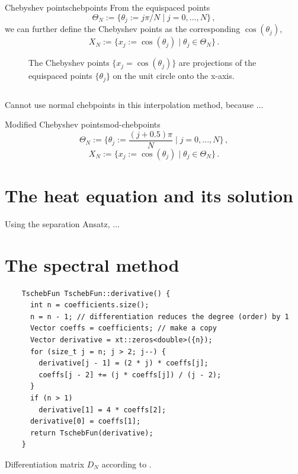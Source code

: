 \documentclass[12pt, a4paper]{article}
\begin{document}
  \begin{definition}{Chebyshev points}{chebpoints}
    From the equispaced points
    $$\Theta_N := \{\theta_j := j\pi/N \;|\; j = 0, ..., N\} \,,$$
    we can further define the Chebyshev points as the corresponding $\cos(\theta_j)$,
    $$X_N := \{x_j := \cos(\theta_j) \;|\; \theta_j \in \Theta_N\} \,.$$
  \end{definition}

  \begin{figure}[H]
    \centering
    \caption{The Chebyshev points $\{x_j = \cos(\theta_j)\}$ are projections of the equispaced points $\{\theta_j\}$ on the unit circle onto the x-axis.}
  \end{figure}

  \inputminted{cpp}{../solver/TschebFun.h}

  Cannot use normal chebpoints in this interpolation method, because ...
  \begin{definition}{Modified Chebyshev points}{mod-chebpoints}
    $$\Theta_N := \{\theta_j := \frac{(j + 0.5)\pi}{N} \;|\; j = 0, ..., N\} \,,$$
    $$X_N := \{x_j := \cos(\theta_j) \;|\; \theta_j \in \Theta_N\} \,.$$
  \end{definition}

  \section{The heat equation and its solution}
  Using the separation Ansatz, ...

  \section{The spectral method}

  \begin{verbatim}
    TschebFun TschebFun::derivative() {
      int n = coefficients.size();
      n = n - 1; // differentiation reduces the degree (order) by 1
      Vector coeffs = coefficients; // make a copy
      Vector derivative = xt::zeros<double>({n});
      for (size_t j = n; j > 2; j--) {
        derivative[j - 1] = (2 * j) * coeffs[j];
        coeffs[j - 2] += (j * coeffs[j]) / (j - 2);
      }
      if (n > 1)
        derivative[1] = 4 * coeffs[2];
      derivative[0] = coeffs[1];
      return TschebFun(derivative);
    }
  \end{verbatim}

  Differentiation matrix $D_N$ according to \cite{spectralmethods}.
\end{document}
